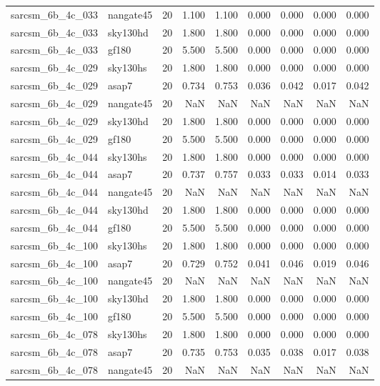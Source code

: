 \begin{tabular}{llrrrrrrr}
sarcsm\_6b\_4c\_033 & nangate45 & 20 & 1.100 & 1.100 & 0.000 & 0.000 & 0.000 & 0.000 \\
sarcsm\_6b\_4c\_033 & sky130hd & 20 & 1.800 & 1.800 & 0.000 & 0.000 & 0.000 & 0.000 \\
sarcsm\_6b\_4c\_033 & gf180 & 20 & 5.500 & 5.500 & 0.000 & 0.000 & 0.000 & 0.000 \\
sarcsm\_6b\_4c\_029 & sky130hs & 20 & 1.800 & 1.800 & 0.000 & 0.000 & 0.000 & 0.000 \\
sarcsm\_6b\_4c\_029 & asap7 & 20 & 0.734 & 0.753 & 0.036 & 0.042 & 0.017 & 0.042 \\
sarcsm\_6b\_4c\_029 & nangate45 & 20 & NaN & NaN & NaN & NaN & NaN & NaN \\
sarcsm\_6b\_4c\_029 & sky130hd & 20 & 1.800 & 1.800 & 0.000 & 0.000 & 0.000 & 0.000 \\
sarcsm\_6b\_4c\_029 & gf180 & 20 & 5.500 & 5.500 & 0.000 & 0.000 & 0.000 & 0.000 \\
sarcsm\_6b\_4c\_044 & sky130hs & 20 & 1.800 & 1.800 & 0.000 & 0.000 & 0.000 & 0.000 \\
sarcsm\_6b\_4c\_044 & asap7 & 20 & 0.737 & 0.757 & 0.033 & 0.033 & 0.014 & 0.033 \\
sarcsm\_6b\_4c\_044 & nangate45 & 20 & NaN & NaN & NaN & NaN & NaN & NaN \\
sarcsm\_6b\_4c\_044 & sky130hd & 20 & 1.800 & 1.800 & 0.000 & 0.000 & 0.000 & 0.000 \\
sarcsm\_6b\_4c\_044 & gf180 & 20 & 5.500 & 5.500 & 0.000 & 0.000 & 0.000 & 0.000 \\
sarcsm\_6b\_4c\_100 & sky130hs & 20 & 1.800 & 1.800 & 0.000 & 0.000 & 0.000 & 0.000 \\
sarcsm\_6b\_4c\_100 & asap7 & 20 & 0.729 & 0.752 & 0.041 & 0.046 & 0.019 & 0.046 \\
sarcsm\_6b\_4c\_100 & nangate45 & 20 & NaN & NaN & NaN & NaN & NaN & NaN \\
sarcsm\_6b\_4c\_100 & sky130hd & 20 & 1.800 & 1.800 & 0.000 & 0.000 & 0.000 & 0.000 \\
sarcsm\_6b\_4c\_100 & gf180 & 20 & 5.500 & 5.500 & 0.000 & 0.000 & 0.000 & 0.000 \\
sarcsm\_6b\_4c\_078 & sky130hs & 20 & 1.800 & 1.800 & 0.000 & 0.000 & 0.000 & 0.000 \\
sarcsm\_6b\_4c\_078 & asap7 & 20 & 0.735 & 0.753 & 0.035 & 0.038 & 0.017 & 0.038 \\
sarcsm\_6b\_4c\_078 & nangate45 & 20 & NaN & NaN & NaN & NaN & NaN & NaN \\

\end{tabular}
